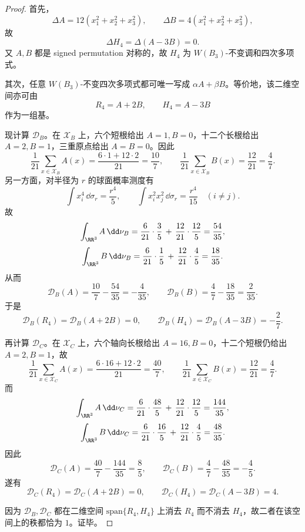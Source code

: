 \begin{proof}
首先，
\[
\Delta A=12(x_1^2+x_2^2+x_3^2),
\qquad
\Delta B=4(x_1^2+x_2^2+x_3^2),
\]
故
\[
\Delta H_4=\Delta(A-3B)=0.
\]
又 \(A,B\) 都是 signed permutation 对称的，故 \(H_4\) 为 \(W(B_3)\)-不变调和四次多项式。

其次，任意 \(W(B_3)\)-不变四次多项式都可唯一写成 \(\alpha A+\beta B\)。等价地，该二维空间亦可由
\[
R_4=A+2B,
\qquad
H_4=A-3B
\]
作为一组基。

现计算 \(\mathcal D_B\)。在 \(\mathcal X_B\) 上，六个短根给出 \(A=1,B=0\)，十二个长根给出 \(A=2,B=1\)，三重原点给出 \(A=B=0\)。因此
\[
\frac1{21}\sum_{x\in\mathcal X_B}A(x)=\frac{6\cdot 1+12\cdot 2}{21}=\frac{10}{7},
\qquad
\frac1{21}\sum_{x\in\mathcal X_B}B(x)=\frac{12}{21}=\frac{4}{7}.
\]
另一方面，对半径为 \(r\) 的球面概率测度有
\[
\int x_i^4\,\dd\sigma_r=\frac{r^4}{5},
\qquad
\int x_i^2x_j^2\,\dd\sigma_r=\frac{r^4}{15}\quad(i\neq j).
\]
故
\[
\int_{\RR^3}A\,\dd\nu_B
=
\frac{6}{21}\cdot\frac{3}{5}
\,+\,
\frac{12}{21}\cdot\frac{12}{5}
=
\frac{54}{35},
\]
\[
\int_{\RR^3}B\,\dd\nu_B
=
\frac{6}{21}\cdot\frac{1}{5}
\,+\,
\frac{12}{21}\cdot\frac{4}{5}
=
\frac{18}{35}.
\]
从而
\[
\mathcal D_B(A)=\frac{10}{7}-\frac{54}{35}=-\frac{4}{35},
\qquad
\mathcal D_B(B)=\frac{4}{7}-\frac{18}{35}=\frac{2}{35}.
\]
于是
\[
\mathcal D_B(R_4)=\mathcal D_B(A+2B)=0,
\qquad
\mathcal D_B(H_4)=\mathcal D_B(A-3B)=-\frac{2}{7}.
\]

再计算 \(\mathcal D_C\)。在 \(\mathcal X_C\) 上，六个轴向长根给出 \(A=16,B=0\)，十二个短根仍给出 \(A=2,B=1\)，故
\[
\frac1{21}\sum_{x\in\mathcal X_C}A(x)=\frac{6\cdot 16+12\cdot 2}{21}=\frac{40}{7},
\qquad
\frac1{21}\sum_{x\in\mathcal X_C}B(x)=\frac{12}{21}=\frac{4}{7}.
\]
而
\[
\int_{\RR^3}A\,\dd\nu_C
=
\frac{6}{21}\cdot\frac{48}{5}
\,+\,
\frac{12}{21}\cdot\frac{12}{5}
=
\frac{144}{35},
\]
\[
\int_{\RR^3}B\,\dd\nu_C
=
\frac{6}{21}\cdot\frac{16}{5}
\,+\,
\frac{12}{21}\cdot\frac{4}{5}
=
\frac{48}{35}.
\]
因此
\[
\mathcal D_C(A)=\frac{40}{7}-\frac{144}{35}=\frac{8}{5},
\qquad
\mathcal D_C(B)=\frac{4}{7}-\frac{48}{35}=-\frac{4}{5}.
\]
遂有
\[
\mathcal D_C(R_4)=\mathcal D_C(A+2B)=0,
\qquad
\mathcal D_C(H_4)=\mathcal D_C(A-3B)=4.
\]

因为 \(\mathcal D_B,\mathcal D_C\) 都在二维空间 \(\mathrm{span}\{R_4,H_4\}\) 上消去 \(R_4\) 而不消去 \(H_4\)，故二者在该空间上的秩都恰为 \(1\)。证毕。
\end{proof}

